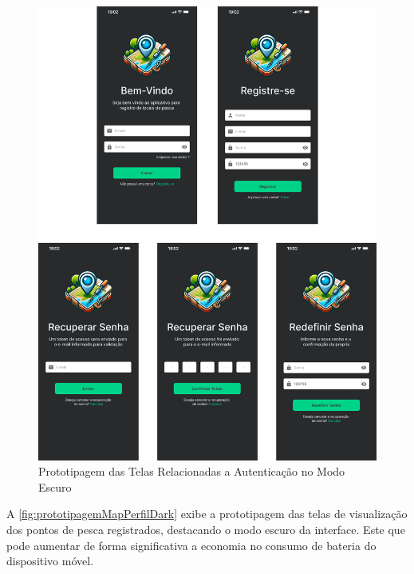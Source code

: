 \begin{figure}[H]
    \centering
    \caption{Prototipagem das Telas Relacionadas a Autenticação no Modo Escuro}
    \label{fig:prototipagemAutenticacaoUsuarioDark}
    \includegraphics[scale=0.30]{./dados/figuras/prototipagem-dark-autenticacao-user.png}
\end{figure}

A \autoref{fig:prototipagemMapPerfilDark} exibe a prototipagem das telas de visualização dos pontos de pesca registrados, destacando o modo escuro da interface. Este que pode aumentar de forma significativa a economia no consumo de bateria do dispositivo móvel.

